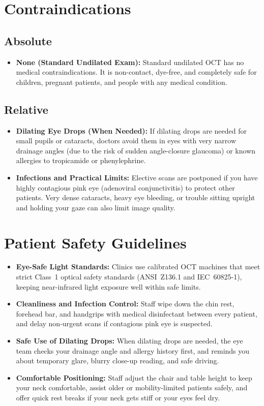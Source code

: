 \section{Contraindications}

\subsection{Absolute}
\begin{itemize}
\item \textbf{None (Standard Undilated Exam):} Standard undilated OCT has no medical contraindications. It is non-contact, dye-free, and completely safe for children, pregnant patients, and people with any medical condition.
\end{itemize}

\subsection{Relative}
\begin{itemize}
\item \textbf{Dilating Eye Drops (When Needed):} If dilating drops are needed for small pupils or cataracts, doctors avoid them in eyes with very narrow drainage angles (due to the risk of sudden angle-closure glaucoma) or known allergies to tropicamide or phenylephrine.
\item \textbf{Infections and Practical Limits:} Elective scans are postponed if you have highly contagious pink eye (adenoviral conjunctivitis) to protect other patients. Very dense cataracts, heavy eye bleeding, or trouble sitting upright and holding your gaze can also limit image quality.
\end{itemize}

\section{Patient Safety Guidelines}
\begin{itemize}
\item \textbf{Eye-Safe Light Standards:} Clinics use calibrated OCT machines that meet strict Class~1 optical safety standards (ANSI~Z136.1 and IEC~60825-1), keeping near-infrared light exposure well within safe limits.
\item \textbf{Cleanliness and Infection Control:} Staff wipe down the chin rest, forehead bar, and handgrips with medical disinfectant between every patient, and delay non-urgent scans if contagious pink eye is suspected.
\item \textbf{Safe Use of Dilating Drops:} When dilating drops are needed, the eye team checks your drainage angle and allergy history first, and reminds you about temporary glare, blurry close-up reading, and safe driving.
\item \textbf{Comfortable Positioning:} Staff adjust the chair and table height to keep your neck comfortable, assist older or mobility-limited patients safely, and offer quick rest breaks if your neck gets stiff or your eyes feel dry.
\end{itemize}

